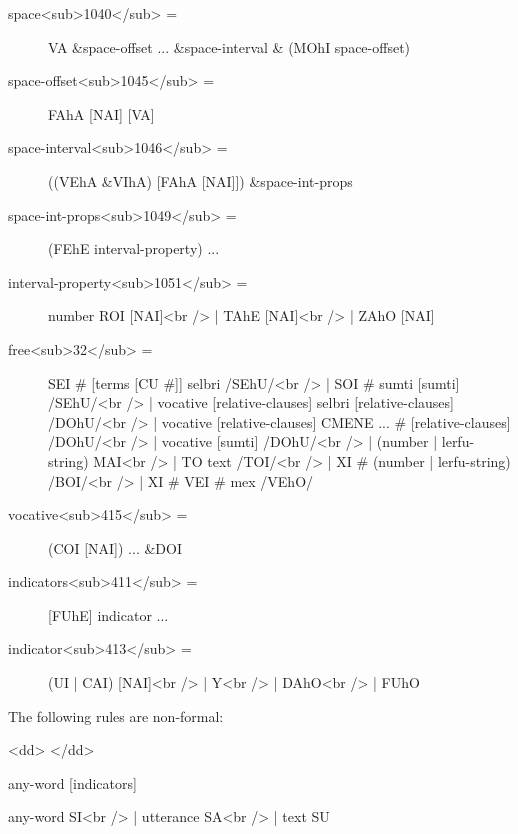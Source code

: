 \begin{description}
\hyperref[html:y1040]{}
\item[space<sub>1040</sub> =] VA \&space-offset ... \&space-interval \&      (MOhI space-offset) \label{html:b1045}
\hyperref[html:y1045]{}
\item[space-offset<sub>1045</sub> =] FAhA [NAI] [VA] \label{html:b1046}
\hyperref[html:y1046]{}
\item[space-interval<sub>1046</sub> =] ((VEhA \&VIhA) [FAhA [NAI]]) \&space-int-props \label{html:b1049}
\hyperref[html:y1049]{}
\item[space-int-props<sub>1049</sub> =] (FEhE interval-property) ... \label{html:b1051}
\hyperref[html:y1051]{}
\item[interval-property<sub>1051</sub> =] number ROI [NAI]<br /> | TAhE [NAI]<br /> | ZAhO [NAI] \label{html:b32}
\hyperref[html:y32]{}
\item[free<sub>32</sub> =] SEI # [terms [CU #]] selbri /SEhU/<br /> | SOI # sumti [sumti] /SEhU/<br /> | vocative [relative-clauses] selbri [relative-clauses] /DOhU/<br /> | vocative [relative-clauses] CMENE ... # [relative-clauses] /DOhU/<br /> | vocative [sumti] /DOhU/<br /> | (number | lerfu-string) MAI<br /> | TO text /TOI/<br /> | XI # (number | lerfu-string) /BOI/<br /> | XI # VEI # mex /VEhO/ \label{html:b415}
\hyperref[html:y415]{}
\item[vocative<sub>415</sub> =] (COI [NAI]) ... \&DOI \label{html:b411}
\hyperref[html:y411]{}
\item[indicators<sub>411</sub> =] [FUhE] indicator ... \label{html:b413}
\hyperref[html:y413]{}
\item[indicator<sub>413</sub> =] (UI | CAI) [NAI]<br /> | Y<br /> | DAhO<br /> | FUhO
\end{description}

The following rules are non-formal:
\begin{description}
      <dd>\label{html:b1100}
\hyperref[html:y1100]{}</dd>
\item[word<sub>1100</sub> =] [BAhE] any-word [indicators]
\item[any-word =] 
\item[anything =]  \label{html:b1101}
\hyperref[html:y1101]{}\item[null<sub>1101</sub> =] any-word SI<br /> | utterance SA<br /> | text SU
\end{description}

